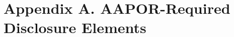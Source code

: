 \documentclass[12pt]{article}
\begin{document}


\clearpage
\appendix



\section*{Appendix A. AAPOR-Required Disclosure Elements}
{}
\label{app:disclosure}
\setcounter{table}{0}
\setcounter{figure}{0}
\renewcommand{\thetable}{A\arabic{table}}
\renewcommand{\thefigure}{A\arabic{figure}}
\renewcommand{\theHtable}{A\arabic{table}}
\renewcommand{\theHfigure}{A\arabic{figure}}
\end{document}
